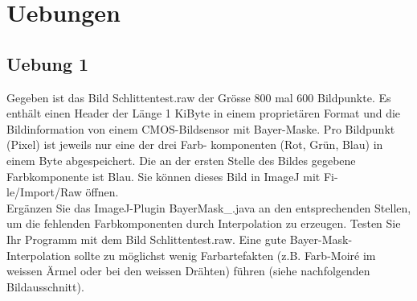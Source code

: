 \documentclass[10pt]{article}
\begin{document}
\section{Uebungen}
\subsection{Uebung 1}
Gegeben ist das Bild Schlittentest.raw der Grösse 800 mal 600 Bildpunkte. Es enthält einen
Header der Länge 1 KiByte in einem proprietären Format und die Bildinformation von einem
CMOS-Bildsensor mit Bayer-Maske. Pro Bildpunkt (Pixel) ist jeweils nur eine der drei Farb-
komponenten (Rot, Grün, Blau) in einem Byte abgespeichert. Die an der ersten Stelle des
Bildes gegebene Farbkomponente ist Blau. Sie können dieses Bild in ImageJ mit Fi-
le/Import/Raw öffnen.\\
Ergänzen Sie das ImageJ-Plugin BayerMask\_.java an den entsprechenden Stellen, um die
fehlenden Farbkomponenten durch Interpolation zu erzeugen. Testen Sie Ihr Programm mit
dem Bild Schlittentest.raw. Eine gute Bayer-Mask-Interpolation sollte zu möglichst wenig
Farbartefakten (z.B. Farb-Moiré im weissen Ärmel oder bei den weissen Drähten) führen
(siehe nachfolgenden Bildausschnitt).

\end{document}
